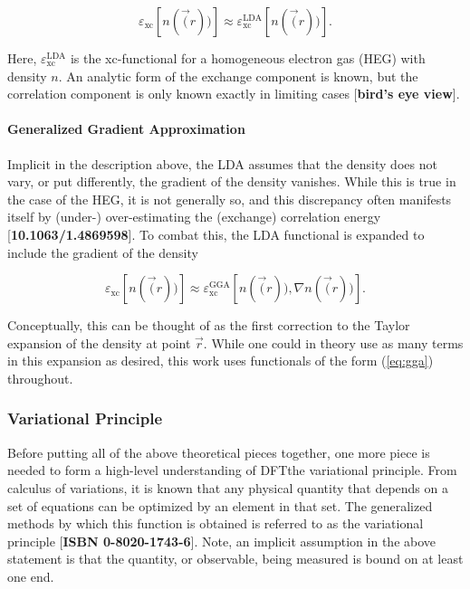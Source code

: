         \begin{equation}
            \varepsilon_\text{xc}[n(\vec(r))] \approx \varepsilon_\text{xc}^\text{LDA}[n(\vec(r))].
        \end{equation}
        
        \noindent Here, $\varepsilon_\text{xc}^\text{LDA}$ is the xc-functional for a homogeneous electron gas (HEG) with density $n$. An analytic form of the exchange component is known, but the correlation component is only known exactly in limiting cases [\textbf{bird's eye view}]. 
        
        \paragraph{Generalized Gradient Approximation} Implicit in the description above, the LDA assumes that the density does not vary, or put differently, the gradient of the density vanishes. While this is true in the case of the HEG, it is not generally so, and this discrepancy often manifests itself by (under-) over-estimating the (exchange) correlation energy [\textbf{10.1063/1.4869598}]. To combat this, the LDA functional is expanded to include the gradient of the density 
        
        \begin{equation}
        \label{eq:gga}
            \varepsilon_\text{xc}[n(\vec(r))] \approx \varepsilon_\text{xc}^\text{GGA}[n(\vec(r)),\nabla n(\vec(r))].
        \end{equation}
        
        \noindent Conceptually, this can be thought of as the first correction to the Taylor expansion of the density at point $\vec{r}$. While one could in theory use as many terms in this expansion as desired, this work uses functionals of the form (\ref{eq:gga}) throughout.
        
        \subsubsection{Variational Principle}
        
        Before putting all of the above theoretical pieces together, one more piece is needed to form a high-level understanding of DFT\textemdash the variational principle. From calculus of variations, it is known that any physical quantity that depends on a set of equations can be optimized by an element in that set. The generalized methods by which this function is obtained is referred to as the variational principle [\textbf{ISBN 0-8020-1743-6}]. Note, an implicit assumption in the above statement is that the quantity, or observable, being measured is bound on at least one end.
        
